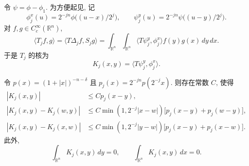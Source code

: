 令 $\psi=\phi-\phi_1$. 为方便起见, 记
\[
 \phi_j^x(u)=2^{-jn}\phi\bigl((u-x)/2^j\bigr),\qquad
 \psi_j^y(u)=2^{-jn}\psi\bigl((u-y)/2^j\bigr).
\]
对 $f,g\in C_c^\infty(\mathbb R^n)$,
\[
 \langle T_jf,g\rangle
 =\langle T\Delta_jf,S_jg\rangle
 =\int_{\mathbb R^n}\int_{\mathbb R^n}
 \langle T\psi_j^y,\phi_j^x\rangle f(y)g(x)\,dy\,dx.
\]
于是 $T_j$ 的核为
\[
 K_j(x,y)=\langle T\psi_j^y,\phi_j^x\rangle.
\]

\hypertarget{chapter-09-page-219}{}

\begin{Lemma}
\label{lem:ch9-smoothed-kernel-estimates}
令 $p(x)=(1+|x|)^{-n-\delta}$ 且 $p_j(x)=2^{-jn}p(2^{-j}x)$. 则存在常数 $C$, 使得
\begin{align*}
 |K_j(x,y)|&\leq Cp_j(x-y),\\
 |K_j(x,y)-K_j(w,y)|&\leq C\min(1,2^{-j}|x-w|)
 \bigl[p_j(x-y)+p_j(w-y)\bigr],\\
 |K_j(x,y)-K_j(x,w)|&\leq C\min(1,2^{-j}|y-w|)
 \bigl[p_j(x-y)+p_j(x-w)\bigr].
\end{align*}
此外,
\[
 \int_{\mathbb R^n}K_j(x,y)\,dy=0,
 \qquad
 \int_{\mathbb R^n}K_j(x,y)\,dx=0.
\]
\end{Lemma}

